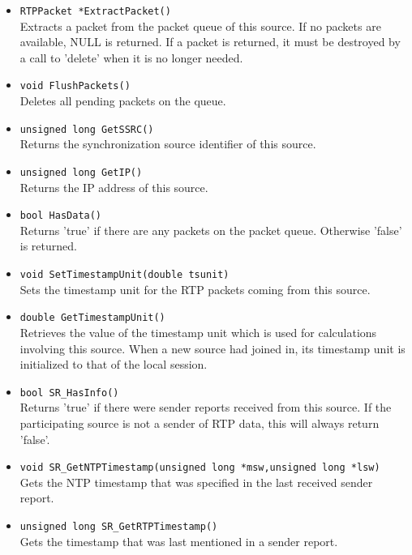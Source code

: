 \begin{itemize}

\item {\tt RTPPacket *ExtractPacket()}\\
	Extracts a packet from the packet queue of this source. If no packets
	are available, NULL is returned. If a packet is returned, it must be
	destroyed by a call to 'delete' when it is no longer needed.

\item {\tt void FlushPackets()}\\
	Deletes all pending packets on the queue.

\item {\tt unsigned long GetSSRC()}\\
	Returns the synchronization source identifier of this source.

\item {\tt unsigned long GetIP()}\\
	Returns the IP address of this source.

\item {\tt bool HasData()}\\
	Returns 'true' if there are any packets on the packet queue. Otherwise
	'false' is returned.

\item {\tt void SetTimestampUnit(double tsunit)}\\
 	Sets the timestamp unit for the RTP packets coming from this source.

\item {\tt double GetTimestampUnit()}\\
	Retrieves the value of the timestamp unit which is used for calculations
	involving this source. When a new source had joined in, its timestamp
	unit is initialized to that of the local session.
	
\item {\tt bool SR\_HasInfo()}\\
	Returns 'true' if there were sender reports received from this
	source. If the participating source is not a sender of RTP data,
	this will always return 'false'.

\item {\tt void SR\_GetNTPTimestamp(unsigned long *msw,unsigned long *lsw)}\\
	Gets the NTP timestamp that was specified in the last received
	sender report.

\item {\tt unsigned long SR\_GetRTPTimestamp()}\\
	Gets the timestamp that was last mentioned in a sender report.


\end{itemize}
